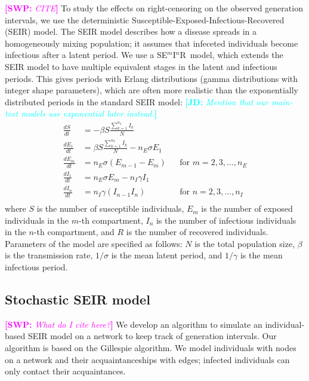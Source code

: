 \documentclass[12pt]{article}
\newcommand{\seminar}{SE\mbox{$^m$}I\mbox{$^n$}R}
\newcommand{\comment}[3]{\textcolor{#1}{\textbf{[#2: }\textsl{#3}\textbf{]}}}
\newcommand{\jd}[1]{\comment{cyan}{JD}{#1}}
\newcommand{\swp}[1]{\comment{magenta}{SWP}{#1}}
\begin{document}
\swp{CITE}
To study the effects on right-censoring on the observed generation intervals, we use the deterministic Susceptible-Exposed-Infectious-Recovered (SEIR) model.
The SEIR model describes how a disease spreads in a homogeneously mixing population; it assumes that infeceted individuals become infectious after a latent period.
We use a \seminar\ model, which extends the SEIR model to have multiple equivalent stages in the latent and infectious periods. This gives periods with Erlang distributions (gamma distributions with integer shape parameters), which are often more realistic than the exponentially distributed periods in the standard SEIR model: 
\jd{Mention that our main-text models use exponential later instead.}
\begin{equation}
\begin{aligned}
\frac{dS}{dt} &= - \beta S \frac{\sum_{k=1}^{n_I} I_k}{N}\\
\frac{dE_1}{dt} &= \beta S \frac{\sum_{k=1}^{n_I} I_k}{N} - n_E \sigma E_1\\
\frac{dE_m}{dt} &= n_E \sigma (E_{m-1} - E_m) && \text{for } m = 2, 3, \dots, n_E\\
\frac{dI_1}{dt} &= n_E \sigma E_m - n_I \gamma I_1\\
\frac{dI_n}{dt} &= n_I \gamma (I_{n-1} I_n) && \text{for } n = 2, 3, \dots, n_I\\
\end{aligned}
\end{equation}
where $S$ is the number of susceptible individuals, $E_m$ is the number of exposed individuals in the $m$-th compartment, $I_n$ is the number of infectious individuals in the $n$-th compartment, and $R$ is the number of recovered individuals.
Parameters of the model are specified as follows: $N$ is the total population size, $\beta$ is the transmission rate, $1/\sigma$ is the mean latent period, and $1/\gamma$ is the mean infectious period.

\subsection{Stochastic SEIR model}

\swp{What do I cite here?}
We develop an algorithm to simulate an individual-based SEIR model on a network to keep track of generation intervals.
Our algorithm is based on the Gillespie algorithm.
We model individuals with nodes on a network and their acquaintanceships with edges; infected individuals can only contact their acquaintances.
\end{document}
